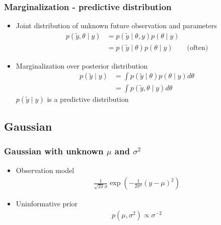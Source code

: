 \documentclass[10pt]{beamer}
\begin{document}
\begin{frame}

\frametitle{Marginalization - predictive distribution}

  \begin{itemize}
\item Joint distribution of unknown future observation and parameters
   \begin{align*}
     p(\tilde{y},\theta \mid y) &= p(\tilde{y} \mid \theta,y) p(\theta \mid y)\\
      &= p(\tilde{y} \mid \theta) p(\theta \mid y) \qquad \text{(often)}
   \end{align*}
   \pause
  \item Marginalization over posterior distribution
      \begin{align*}
        p(\tilde{y} \mid y) & = \int p(\tilde{y} \mid \theta)p(\theta \mid y) d\theta\\
         & = \int p(\tilde{y}, \theta \mid y) d\theta
      \end{align*}
      $p(\tilde{y} \mid y)$ is a predictive distribution
  \end{itemize}

\end{frame}

\subsection{Gaussian}

\begin{frame}
\frametitle{Gaussian with unknown $\mu$ and $\sigma^2$}

\begin{itemize}
\item Observation model
  \begin{align*}
   \frac{1}{\sqrt{2\pi}\sigma}\exp\left(-\frac{1}{2\sigma^2}(y-\mu)^2 \right)
   \end{align*}
\item Uninformative prior
  \begin{align*}
    p(\mu,\sigma^2)\propto \sigma^{-2}
  \end{align*}
\end{itemize}

\end{frame}
\end{document}

